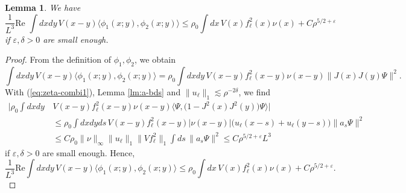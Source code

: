 \documentclass[a4paper,11pt]{article}
\def\eps{\varepsilon}
\newtheorem{lemma}[theorem]{Lemma}
\numberwithin{equation}{section}
\begin{document}
\begin{lemma} We have 
\[ \frac{1}{L^3} \text{Re } \int dx dy \, V(x-y) \langle \phi_1 (x;y) , \phi_2 (x;y) \rangle \leq \rho_0 \int dx \, V(x) f_\ell^2 (x) \nu (x)  + C \rho^{5/2+\eps}  \]
if $\eps , \delta > 0$ are small enough. 
\end{lemma} 
\begin{proof} 
From the definition of $\phi_1, \phi_2$, we obtain 
\[ \int dx dy \, V(x-y) \langle \phi_1 (x;y) , \phi_2 (x;y) \rangle = \rho_0 \int dx dy \, V(x-y) f_\ell^2 (x-y) \nu (x-y) \| J(x) J(y) \Psi \|^2 . \]
With (\ref{eq:zeta-combi1}), Lemma \ref{lm:a-bds} and $\| u_\ell \|_1 \lesssim \rho^{-2\delta}$, we find 
\[ \begin{split} \Big| \rho_0 \int dx dy \,& V(x-y) f_\ell^2 (x-y) \nu (x-y) \langle \Psi, \big( 1 - J^2 (x) J^2 (y) \big) \Psi \rangle \Big| \\ &\leq \rho_0 \int dx dy ds \, V(x-y) f_\ell^2(x-y)|\nu (x-y)| \big(u_\ell (x-s) + u_\ell (y-s) \big) \| a_s \Psi \|^2 \\ &\leq C \rho_0 \| \nu \|_\infty \| u_\ell \|_1 \|Vf_\ell^2\|_1 \int ds \, \| a_s \Psi \|^2  \leq C \rho^{5/2+\eps} L^3 \end{split} \]
if $\eps , \delta > 0$ are small enough. Hence,
\[ \frac{1}{L^3} \text{Re} \int dx dy \, V(x-y) \langle \phi_1 (x;y) , \phi_2 (x;y) \rangle \leq \rho_0 \int dx \, V(x) f_\ell^2 (x) \nu (x) + C \rho^{5/2+\eps} .\]
\end{proof}
\end{document}
